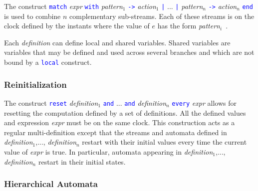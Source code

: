 \documentclass[11pt,titlepage,twoside]{report}
\newcommand{\AND}{\mbox{{\tt and}}}
\renewcommand{\Reset}{\mbox{{\tt reset}}}
\newcommand{\Every}{\mbox{{\tt every}}}
\newcommand{\term}[1]{\textcolor{Blue}{\tt #1}}
\newcommand{\nterm}[1]{\textcolor{BrickRed}{\it #1}}
\newcommand{\term}[1]{{\tt #1}}
\newcommand{\nterm}[1]{{\em #1}}
\begin{document}
The construct
\term{match} \nterm{expr} \term{with} \nterm{pattern}$_1$ \term{->}
\nterm{action}$_1$ \term{|} ... \term{|} \nterm{pattern}$_n$ \term{->}
\nterm{action}$_n$ \term{end} is used to combine $n$ complementary
sub-streams. Each of these streams is on the clock defined by the
instants where the value of $e$ has the form \nterm{pattern}$_i$\ .

Each \nterm{definition} can define local and shared variables.
Shared variables are variables that may be defined and used across several 
branches and which are not bound by a \term{local} construct.

\subsubsection{Reinitialization}

The construct \term{\Reset} \nterm{definition}$_1$ \term{\AND} ...
\term{\AND} \nterm{definition}$_n$ \term{\Every} \nterm{expr} allows
for resetting the computation defined by a set of definitions. All the
defined values and expression \nterm{expr} must be on the same
clock. This construction acts as a regular multi-definition except
that the streams and automata defined in
\nterm{definition}$_1$,..., \nterm{definition}$_n$ restart with their
initial values every time the current value of {\em expr} is true. In
particular, automata appearing in \nterm{definition}$_1$,...,
\nterm{definition}$_n$ restart in their initial states.

\subsubsection{Hierarchical Automata}
\end{document}
